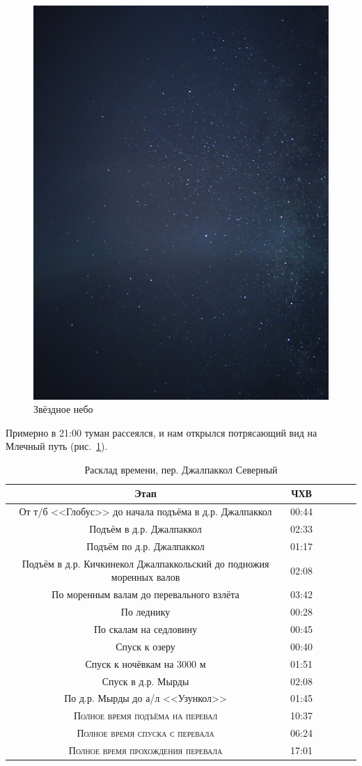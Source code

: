 \begin{figure}[h!]	
	\centering
	\includegraphics[angle=0, width=0.7\linewidth]{../pics/IMG_20240823_205116}
	\caption{Звёздное небо}
	\label{fig:IMG_20240823_205116}
\end{figure}
 
Примерно в 21:00 туман рассеялся, и нам открылся потрясающий вид на Млечный путь (рис.~\ref{fig:IMG_20240823_205116}).
 
 \begin{table}[h!]
 	\centering
 	\begin{tabular}{|c|c|c|c|c|c|} 
 		\hline 
 		Этап & ЧХВ \\ 	
 		\hline 
 		От т/б <<Глобус>> до начала подъёма в д.р. Джалпаккол  & 00:44 \\
 		Подъём в д.р. Джалпаккол  & 02:33 \\
 		Подъём по д.р. Джалпаккол & 01:17\\ 
 		Подъём в д.р. Кичкинекол Джалпаккольский до подножия моренных валов & 02:08\\ 
 		По моренным валам до перевального взлёта & 03:42\\ 
 		По леднику & 00:28 \\
 		По скалам на седловину & 00:45 \\
 		Спуск к озеру & 00:40 \\
 		Спуск к ночёвкам на 3000 м & 01:51 \\
 		Спуск в д.р. Мырды & 02:08 \\
 		По д.р. Мырды до а/л <<Узункол>>& 01:45 \\
 		\hline
 		\textsc{Полное время подъёма на перевал  }& 10:37\\
 		\textsc{Полное время спуска с перевала }& 06:24 \\
 		\textsc{	Полное время прохождения перевала }& 17:01 \\
 		\hline
 	\end{tabular}
 	\caption{Расклад времени, пер. Джалпаккол Северный}
 \end{table}
 
